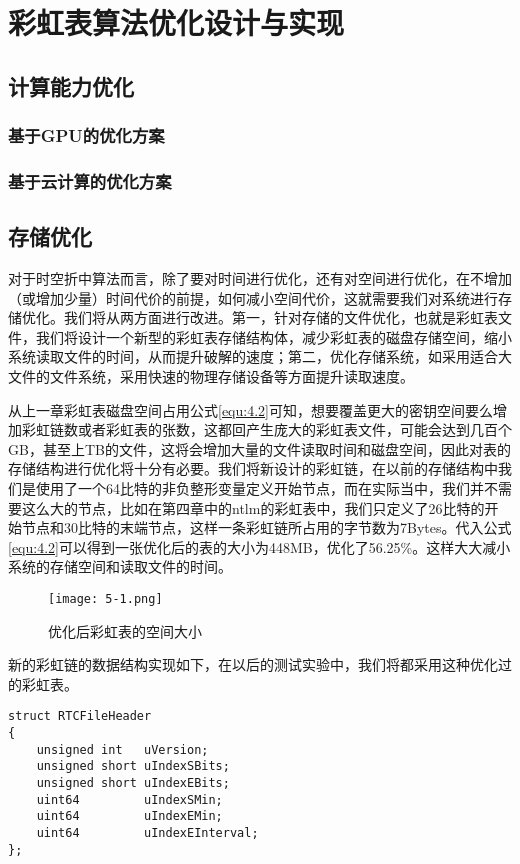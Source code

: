 \chapter{彩虹表算法优化设计与实现}
\section{计算能力优化}
	\subsection{基于GPU的优化方案}
	\subsection{基于云计算的优化方案}
\section{存储优化}
对于时空折中算法而言，除了要对时间进行优化，还有对空间进行优化，在不增加（或增加少量）时间代价的前提，如何减小空间代价，这就需要我们对系统进行存储优化。我们将从两方面进行改进。第一，针对存储的文件优化，也就是彩虹表文件，我们将设计一个新型的彩虹表存储结构体，减少彩虹表的磁盘存储空间，缩小系统读取文件的时间，从而提升破解的速度；第二，优化存储系统，如采用适合大文件的文件系统，采用快速的物理存储设备等方面提升读取速度。

从上一章彩虹表磁盘空间占用公式\eqref{equ:4.2}可知，想要覆盖更大的密钥空间要么增加彩虹链数或者彩虹表的张数，这都回产生庞大的彩虹表文件，可能会达到几百个GB，甚至上TB的文件，这将会增加大量的文件读取时间和磁盘空间，因此对表的存储结构进行优化将十分有必要。我们将新设计的彩虹链，在以前的存储结构中我们是使用了一个64比特的非负整形变量定义开始节点，而在实际当中，我们并不需要这么大的节点，比如在第四章中的ntlm的彩虹表中，我们只定义了26比特的开始节点和30比特的末端节点，这样一条彩虹链所占用的字节数为7Bytes。代入公式\eqref{equ:4.2}可以得到一张优化后的表的大小为448MB，优化了56.25\%。这样大大减小系统的存储空间和读取文件的时间。
\begin{figure}[!ht]
\centering
\texttt{[image: 5-1.png]}
\caption{优化后彩虹表的空间大小}
\label{fig:5.1}
\end{figure}

新的彩虹链的数据结构实现如下，在以后的测试实验中，我们将都采用这种优化过的彩虹表。
\begin{lstlisting}
struct RTCFileHeader
{
    unsigned int   uVersion;    
    unsigned short uIndexSBits; 
    unsigned short uIndexEBits; 
    uint64         uIndexSMin;
    uint64         uIndexEMin;
    uint64         uIndexEInterval;
};
\end{lstlisting}

